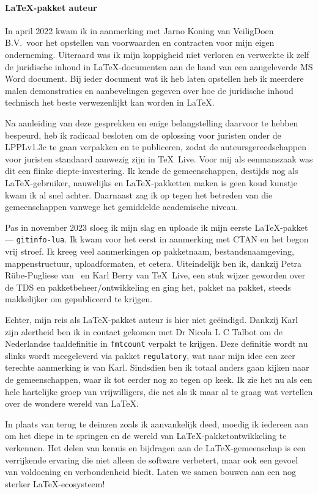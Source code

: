 \documentclass[dutch]{ltugboat}
\begin{document}
    \paragraph{\LaTeX-pakket auteur}
    In april 2022 kwam ik in aanmerking met Jarno Koning van VeiligDoen B.V.\ voor het opstellen van voorwaarden en contracten voor mijn eigen onderneming.
    Uiteraard was ik mijn koppigheid niet verloren en verwerkte ik zelf de juridische inhoud in \LaTeX-documenten aan de hand van een aangeleverde MS Word document.
    Bij ieder document wat ik heb laten opstellen heb ik meerdere malen demonstraties en aanbevelingen gegeven over hoe de juridische inhoud technisch het beste verwezenlijkt kan worden in \LaTeX.

    Na aanleiding van deze gesprekken en enige belangstelling daarvoor te hebben bespeurd, heb ik radicaal besloten om de oplossing voor juristen onder de LPPLv1.3c te gaan verpakken en te publiceren, zodat de auteursgereedschappen voor juristen standaard aanwezig zijn in \TeX\ Live.
    Voor mij als eenmanszaak was dit een flinke diepte-investering.
    Ik kende de gemeenschappen, destijds nog als \LaTeX-gebruiker, nauwelijks en \LaTeX-pakketten maken is geen koud kunstje kwam ik al snel achter.
    Daarnaast zag ik op tegen het betreden van die gemeenschappen vanwege het gemiddelde academische niveau.

    Pas in november 2023 sloeg ik mijn slag en uploade ik mijn eerste \LaTeX-pakket — \texttt{gitinfo-lua}.
    Ik kwam voor het eerst in aanmerking met CTAN en het begon vrij stroef.
    Ik kreeg veel aanmerkingen op pakketnaam, bestandsnaamgeving, mappenstructuur, uploadformaten, et cetera.
    Uiteindelijk ben ik, dankzij Petra Rübe-Pugliese van \CTAN\ en Karl Berry van \TeX\ Live, een stuk wijzer geworden over de TDS en pakketbeheer/ontwikkeling en ging het, pakket na pakket, steeds makkelijker om gepubliceerd te krijgen.

    Echter, mijn reis als \LaTeX-pakket auteur is hier niet geëindigd.
    Dankzij Karl zijn alertheid ben ik in contact gekomen met Dr Nicola L C Talbot om de Nederlandse taaldefinitie in \texttt{fmtcount} verpakt te krijgen.
    Deze definitie wordt nu slinks wordt meegeleverd via pakket \texttt{regulatory}, wat naar mijn idee een zeer terechte aanmerking is van Karl.
    Sindsdien ben ik totaal anders gaan kijken naar de gemeenschappen, waar ik tot eerder nog zo tegen op keek.
    Ik zie het nu als een hele hartelijke groep van vrijwilligers, die net als ik maar al te graag wat vertellen over de wondere wereld van \LaTeX.

    In plaats van terug te deinzen zoals ik aanvankelijk deed, moedig ik iedereen aan om het diepe in te springen en de wereld van \LaTeX-pakketontwikkeling te verkennen.
    Het delen van kennis en bijdragen aan de \LaTeX-gemeenschap is een verrijkende ervaring die niet alleen de software verbetert, maar ook een gevoel van voldoening en verbondenheid biedt.
    Laten we samen bouwen aan een nog sterker \LaTeX-ecosysteem!
\end{document}
